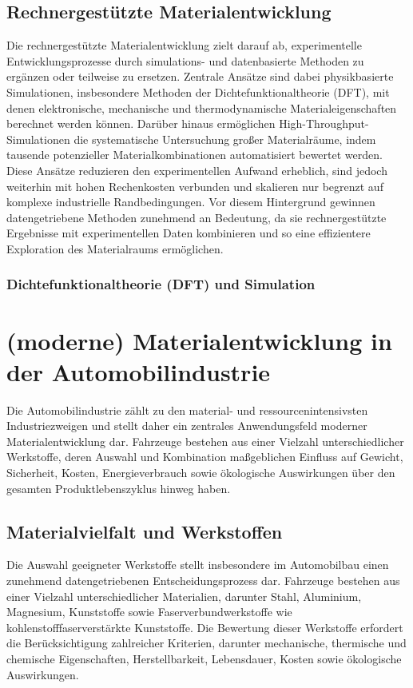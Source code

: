 \subsection{Rechnergestützte Materialentwicklung} 

Die rechnergestützte Materialentwicklung zielt darauf ab, experimentelle Entwicklungsprozesse durch simulations- und datenbasierte Methoden zu ergänzen oder teilweise zu ersetzen. Zentrale Ansätze sind dabei physikbasierte Simulationen, insbesondere Methoden der Dichtefunktionaltheorie (DFT), mit denen elektronische, mechanische und thermodynamische Materialeigenschaften berechnet werden können.
Darüber hinaus ermöglichen High-Throughput-Simulationen die systematische Untersuchung großer Materialräume, indem tausende potenzieller Materialkombinationen automatisiert bewertet werden. Diese Ansätze reduzieren den experimentellen Aufwand erheblich, sind jedoch weiterhin mit hohen Rechenkosten verbunden und skalieren nur begrenzt auf komplexe industrielle Randbedingungen.
Vor diesem Hintergrund gewinnen datengetriebene Methoden zunehmend an Bedeutung, da sie rechnergestützte Ergebnisse mit experimentellen Daten kombinieren und so eine effizientere Exploration des Materialraums ermöglichen. \cite{kihara2012computer}

\subsubsection{Dichtefunktionaltheorie (DFT) und Simulation}



\section{(moderne) Materialentwicklung in der Automobilindustrie}
Die Automobilindustrie zählt zu den material- und ressourcenintensivsten Industriezweigen und stellt daher ein zentrales Anwendungsfeld moderner Materialentwicklung dar. Fahrzeuge bestehen aus einer Vielzahl unterschiedlicher Werkstoffe, deren Auswahl und Kombination maßgeblichen Einfluss auf Gewicht, Sicherheit, Kosten, Energieverbrauch sowie ökologische Auswirkungen über den gesamten Produktlebenszyklus hinweg haben.

\subsection{Materialvielfalt und Werkstoffen}
Die Auswahl geeigneter Werkstoffe stellt insbesondere im Automobilbau einen zunehmend datengetriebenen Entscheidungsprozess dar. Fahrzeuge bestehen aus einer Vielzahl unterschiedlicher Materialien, darunter Stahl, Aluminium, Magnesium, Kunststoffe sowie Faserverbundwerkstoffe wie kohlenstofffaserverstärkte Kunststoffe. Die Bewertung dieser Werkstoffe erfordert die Berücksichtigung zahlreicher Kriterien, darunter mechanische, thermische und chemische Eigenschaften, Herstellbarkeit, Lebensdauer, Kosten sowie ökologische Auswirkungen. \cite{fentahun2018materials}

